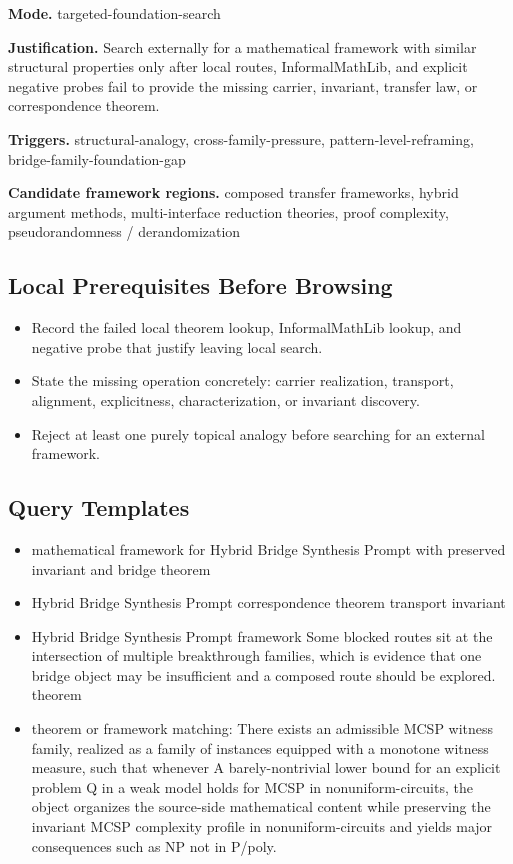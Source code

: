\documentclass[11pt]{article}
\begin{document}
\textbf{Mode.} targeted-foundation-search

\textbf{Justification.} Search externally for a mathematical framework with similar structural properties only after local routes, InformalMathLib, and explicit negative probes fail to provide the missing carrier, invariant, transfer law, or correspondence theorem.

\textbf{Triggers.} structural-analogy, cross-family-pressure, pattern-level-reframing, bridge-family-foundation-gap

\textbf{Candidate framework regions.} composed transfer frameworks, hybrid argument methods, multi-interface reduction theories, proof complexity, pseudorandomness / derandomization

\subsection*{Local Prerequisites Before Browsing}
\begin{itemize}[leftmargin=*,itemsep=0.2em]
\item Record the failed local theorem lookup, InformalMathLib lookup, and negative probe that justify leaving local search.
\item State the missing operation concretely: carrier realization, transport, alignment, explicitness, characterization, or invariant discovery.
\item Reject at least one purely topical analogy before searching for an external framework.
\end{itemize}
\subsection*{Query Templates}
\begin{itemize}[leftmargin=*,itemsep=0.2em]
\item mathematical framework for Hybrid Bridge Synthesis Prompt with preserved invariant and bridge theorem
\item Hybrid Bridge Synthesis Prompt correspondence theorem transport invariant
\item Hybrid Bridge Synthesis Prompt framework Some blocked routes sit at the intersection of multiple breakthrough families, which is evidence that one bridge object may be insufficient and a composed route should be explored. theorem
\item theorem or framework matching: There exists an admissible MCSP witness family, realized as a family of instances equipped with a monotone witness measure, such that whenever A barely-nontrivial lower bound for an explicit problem Q in a weak model holds for MCSP in nonuniform-circuits, the object organizes the source-side mathematical content while preserving the invariant MCSP complexity profile in nonuniform-circuits and yields major consequences such as NP not in P/poly.
\end{itemize}
\end{document}
